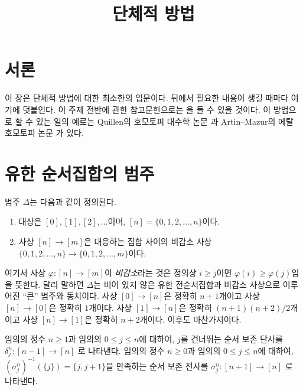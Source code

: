 

%


\title{단체적 방법}


\maketitle

\label{section-phantom}

\tableofcontents

\section{서론}
\label{section-introduction}

\noindent
이 장은 단체적 방법에 대한 최소한의 입문이다.
뒤에서 필요한 내용이 생길 때마다 여기에 덧붙인다.
이 주제 전반에 관한 참고문헌으로는 
\cite{SimpHom}을 들 수 있을 것이다.
이 방법으로 할 수 있는 일의 예로는 Quillen의 호모토피 대수학 논문
\cite{Quillen}과 Artin--Mazur의 에탈 호모토피 논문
\cite{ArtinMazur}가 있다.

\section{유한 순서집합의 범주}
\label{section-Delta}

\noindent
범주 $\Delta$는 다음과 같이 정의된다.
\begin{enumerate}
\item 대상은 $[0], [1], [2], \ldots$이며,
$[n] = \{0, 1, 2, \ldots, n\}$이다.
\item 사상 $[n] \to [m]$은 대응하는 집합 사이의 비감소 사상
$\{0, 1, 2, \ldots, n\} \to \{0, 1, 2, \ldots, m\}$이다.
\end{enumerate}
여기서 사상 $\varphi : [n] \to [m]$이 {\it 비감소}라는 것은 정의상
$i \geq j$이면 $\varphi(i) \geq \varphi(j)$임을 뜻한다.
달리 말하면 $\Delta$는 비어 있지 않은 유한 전순서집합과 비감소 사상으로
이루어진 ``큰'' 범주와 동치이다. 사상 $[0] \to [n]$은 정확히 $n + 1$개이고
사상 $[n] \to [0]$은 정확히 $1$개이다. 사상 $[1] \to [n]$은 정확히
$(n + 1)(n + 2)/2$개이고 사상 $[n] \to [1]$은 정확히 $n + 2$개이다.
이후도 마찬가지이다.

\begin{definition}
\label{definition-face-degeneracy}
임의의 정수 $n\geq 1$과 임의의 $0\leq j \leq n$에 대하여,
$j$를 건너뛰는 순서 보존 단사를
{\it $\delta^n_j : [n-1] \to [n]$}
로 나타낸다. 임의의 정수 $n\geq 0$과 임의의 $0\leq j \leq n$에 대하여,
$(\sigma^n_j)^{-1}(\{j\}) = \{j, j + 1\}$을 만족하는 순서 보존 전사를
{\it $\sigma^n_j : [n + 1]  \to [n]$}
로 나타낸다.
\end{definition}

